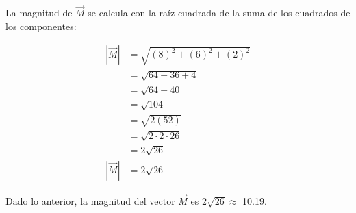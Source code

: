 \documentclass[12pt]{article}
\begin{document}
La magnitud de $\vec{M}$ se calcula con la raíz cuadrada de la suma de los cuadrados de los componentes:

\begin{align*}
	|\vec{M}| &= \sqrt{ (8)^2 + (6)^2 + (2)^2 } \\
	&= \sqrt{ 64 + 36 + 4 } \\
	&= \sqrt{ 64 + 40 } \\
	&= \sqrt{104} \\
	&= \sqrt{2 \left( 52 \right) } \\
	&= \sqrt{2 \cdot 2 \cdot 26} \\
	&= 2\sqrt{26} \\
	|\vec{M}| &= 2 \sqrt{26}
\end{align*}

Dado lo anterior, la magnitud del vector $\vec{M}$ es $2\sqrt{26} \approx$ 10.19.
\end{document}
